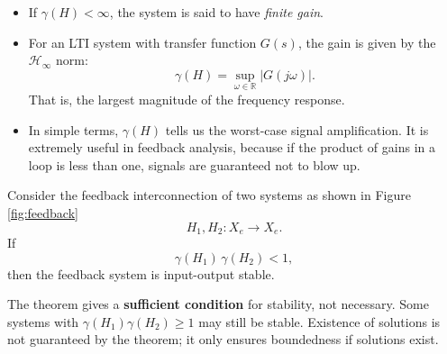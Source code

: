 \begin{itemize}
    \item If $\gamma(H)<\infty$, the system is said to have \emph{finite gain}.  
    \item For an LTI system with transfer function $G(s)$, the gain is given by the $\mathcal{H}_\infty$ norm:
    \begin{equation}
    \gamma(H) = \sup_{\omega \in \mathbb{R}} |G(j\omega)|.
    \end{equation}
    That is, the largest magnitude of the frequency response.  
    \item In simple terms, $\gamma(H)$ tells us the worst-case signal amplification. It is extremely useful in feedback analysis, because if the product of gains in a loop is less than one, signals are guaranteed not to blow up.
\end{itemize}

\begin{theorem}
Consider the feedback interconnection of two systems as shown in Figure \ref{fig:feedback}
\begin{equation}
H_1, H_2 : X_e \to X_e.
\end{equation}
If 
\begin{equation}
\gamma(H_1)\,\gamma(H_2) < 1,
\end{equation}
then the feedback system is input-output stable.
\end{theorem}

\begin{remark}
 The theorem gives a \textbf{sufficient condition} for stability, not necessary. Some systems with $\gamma(H_1)\gamma(H_2)\geq 1$ may still be stable. Existence of solutions is not guaranteed by the theorem; it only ensures boundedness if solutions exist.
\end{remark}

